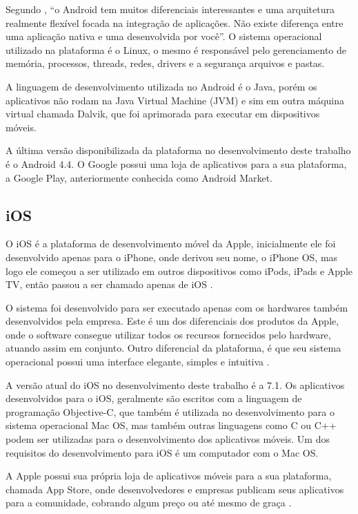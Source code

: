 \documentclass[
	12pt,				%
	openright,			%
	oneside,			%
	a4paper,			%
	chapter=TITLE,		%
	section=TITLE,		%
	english,			%
	french,				%
	spanish,			%
	brazil				%
	]{abntex2}
\begin{document}
Segundo , “o Android tem muitos diferenciais interessantes e uma arquitetura realmente flexível focada na integração de aplicações. Não existe diferença entre uma aplicação nativa e uma desenvolvida por você”. O sistema operacional utilizado na plataforma é o Linux, o mesmo é responsável pelo gerenciamento de memória, processos, threads, redes, drivers e a segurança arquivos e pastas. 

A linguagem de desenvolvimento utilizada no Android é o Java, porém os aplicativos não rodam na Java Virtual Machine (JVM) e sim em outra máquina virtual chamada Dalvik, que foi aprimorada para executar em dispositivos móveis. 

A última versão disponibilizada da plataforma no desenvolvimento deste trabalho é o Android 4.4. O Google possui uma loja de aplicativos para a sua plataforma, a Google Play, anteriormente conhecida como Android Market.

\subsection{iOS}
O iOS é a plataforma de desenvolvimento móvel da Apple, inicialmente ele foi desenvolvido apenas para o iPhone, onde derivou seu nome, o iPhone OS, mas logo ele começou a ser utilizado em outros dispositivos como iPods, iPads e Apple TV, então passou a ser chamado apenas de iOS \cite{milaniIOS}. 

O sistema foi desenvolvido para ser executado apenas com os hardwares também desenvolvidos pela empresa. Este é um dos diferenciais dos produtos da Apple, onde o software consegue utilizar todos os recursos fornecidos pelo hardware, atuando assim em conjunto. Outro diferencial da plataforma, é que seu sistema operacional possui uma interface elegante, simples e intuitiva \cite{milaniIOS}. 

A versão atual do iOS no desenvolvimento deste trabalho é a 7.1. Os aplicativos desenvolvidos para o iOS, geralmente são escritos com a linguagem de programação Objective-C, que também é utilizada no desenvolvimento para o sistema operacional Mac OS, mas também outras linguagens como C ou C++ podem ser utilizadas para o desenvolvimento dos aplicativos móveis. Um dos requisitos do desenvolvimento para iOS é um computador com o Mac OS. 

A Apple possui sua própria loja de aplicativos móveis para a sua plataforma, chamada App Store, onde desenvolvedores e empresas publicam seus aplicativos para a comunidade, cobrando algum preço ou até mesmo de graça \cite{pilonesIOS}.
\end{document}
